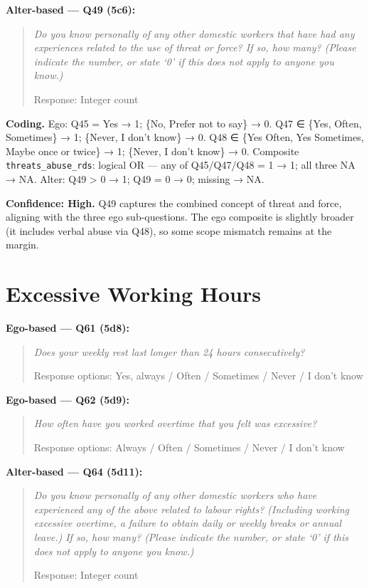 \documentclass[
  12pt,
  letterpaper,
  DIV=11,
  numbers=noendperiod]{scrreprt}
\begin{document}
\textbf{Alter-based --- Q49 (5c6):}

\begin{quote}
\emph{Do you know personally of any other domestic workers that have had
any experiences related to the use of threat or force? If so, how many?
(Please indicate the number, or state `0' if this does not apply to
anyone you know.)}

Response: Integer count
\end{quote}

\textbf{Coding.} Ego: Q45 = Yes → 1; \{No, Prefer not to say\} → 0. Q47
∈ \{Yes, Often, Sometimes\} → 1; \{Never, I don't know\} → 0. Q48 ∈
\{Yes Often, Yes Sometimes, Maybe once or twice\} → 1; \{Never, I don't
know\} → 0. Composite \texttt{threats\_abuse\_rds}: logical OR --- any
of Q45/Q47/Q48 = 1 → 1; all three NA → NA. Alter: Q49 \textgreater{} 0 →
1; Q49 = 0 → 0; missing → NA.

\textbf{Confidence: High.} Q49 captures the combined concept of threat
and force, aligning with the three ego sub-questions. The ego composite
is slightly broader (it includes verbal abuse via Q48), so some scope
mismatch remains at the margin.

\section{Excessive Working Hours}\label{sec-b-hours}

\textbf{Ego-based --- Q61 (5d8):}

\begin{quote}
\emph{Does your weekly rest last longer than 24 hours consecutively?}

Response options: Yes, always / Often / Sometimes / Never / I don't know
\end{quote}

\textbf{Ego-based --- Q62 (5d9):}

\begin{quote}
\emph{How often have you worked overtime that you felt was excessive?}

Response options: Always / Often / Sometimes / Never / I don't know
\end{quote}

\textbf{Alter-based --- Q64 (5d11):}

\begin{quote}
\emph{Do you know personally of any other domestic workers who have
experienced any of the above related to labour rights? (Including
working excessive overtime, a failure to obtain daily or weekly breaks
or annual leave.) If so, how many? (Please indicate the number, or state
`0' if this does not apply to anyone you know.)}

Response: Integer count
\end{quote}
\end{document}
